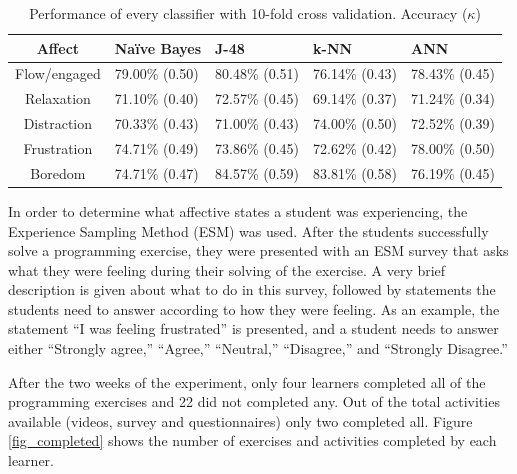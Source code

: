 \documentclass[a4paper,twoside]{article}
\begin{document}


\begin{table}[!t]
\centering
\caption{Performance of every classifier with 10-fold cross validation. Accuracy ($\kappa$) }
\label{tab_performance}
    \begin{tabular}{ | c | l | l | l | l | }
    \hline
    Affect          & Na\"ive Bayes           & J-48                & k-NN              & ANN \\
    \hline
    Flow/engaged    & 79.00\% (0.50) & 80.48\% (0.51) & 76.14\% (0.43) & 78.43\% (0.45) \\
    \hline
    Relaxation      & 71.10\% (0.40) & 72.57\% (0.45) & 69.14\% (0.37) & 71.24\% (0.34)\\
    \hline
    Distraction     & 70.33\% (0.43) & 71.00\% (0.43) & 74.00\% (0.50) & 72.52\% (0.39)\\
    \hline
    Frustration     & 74.71\% (0.49) & 73.86\% (0.45) & 72.62\% (0.42) & 78.00\% (0.50)\\
    \hline
    Boredom         & 74.71\% (0.47) & 84.57\% (0.59) & 83.81\% (0.58) & 76.19\% (0.45)\\
    \hline
    \end{tabular}
\end{table}



In order to determine what affective states a student was experiencing, the
Experience Sampling Method (ESM) \cite{kubey1996experience} was used.
After the students successfully solve a programming exercise, they were presented
with an ESM survey that asks what they were feeling during their solving of the
exercise. A very brief description is given about what to do in this survey,
followed by statements the students need to answer according to how they were
feeling. As an example, the statement “I was feeling frustrated” is presented,
and a student needs to answer either “Strongly agree,” “Agree,” “Neutral,”
“Disagree,” and “Strongly Disagree.”

After the two weeks of the experiment, only four learners completed all of the
programming exercises and 22 did not completed any. Out of the total activities
available (videos, survey and questionnaires) only two completed all. Figure \ref{fig_completed}
shows the number of exercises and activities completed by each learner.
  
\end{document}
